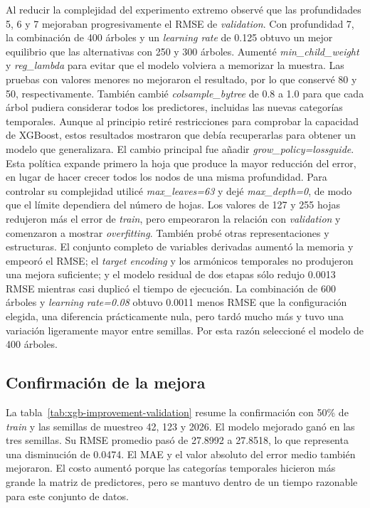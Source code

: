 \documentclass[a4paper,12pt,twocolumn]{report}
\begin{document}
Al reducir la complejidad del experimento extremo observé que las profundidades 5, 6 y 7 mejoraban progresivamente el RMSE de \textit{validation}. Con profundidad 7, la combinación de 400 árboles y un \textit{learning rate} de 0.125 obtuvo un mejor equilibrio que las alternativas con 250 y 300 árboles.
\newline
Aumenté \textit{min\_child\_weight} y \textit{reg\_lambda} para evitar que el modelo volviera a memorizar la muestra. Las pruebas con valores menores no mejoraron el resultado, por lo que conservé 80 y 50, respectivamente. También cambié \textit{colsample\_bytree} de 0.8 a 1.0 para que cada árbol pudiera considerar todos los predictores, incluidas las nuevas categorías temporales. Aunque al principio retiré restricciones para comprobar la capacidad de XGBoost, estos resultados mostraron que debía recuperarlas para obtener un modelo que generalizara.
\newline
El cambio principal fue añadir \textit{grow\_policy=lossguide}. Esta política expande primero la hoja que produce la mayor reducción del error, en lugar de hacer crecer todos los nodos de una misma profundidad. Para controlar su complejidad utilicé \textit{max\_leaves=63} y dejé \textit{max\_depth=0}, de modo que el límite dependiera del número de hojas. Los valores de 127 y 255 hojas redujeron más el error de \textit{train}, pero empeoraron la relación con \textit{validation} y comenzaron a mostrar \textit{overfitting}.
\newline
También probé otras representaciones y estructuras. El conjunto completo de variables derivadas aumentó la memoria y empeoró el RMSE; el \textit{target encoding} y los armónicos temporales no produjeron una mejora suficiente; y el modelo residual de dos etapas sólo redujo 0.0013 RMSE mientras casi duplicó el tiempo de ejecución. La combinación de 600 árboles y \textit{learning rate=0.08} obtuvo 0.0011 menos RMSE que la configuración elegida, una diferencia prácticamente nula, pero tardó mucho más y tuvo una variación ligeramente mayor entre semillas. Por esta razón seleccioné el modelo de 400 árboles.

\balance
\subsection{Confirmación de la mejora}

La tabla~\ref{tab:xgb-improvement-validation} resume la confirmación con 50\% de \textit{train} y las semillas de muestreo 42, 123 y 2026. El modelo mejorado ganó en las tres semillas. Su RMSE promedio pasó de 27.8992 a 27.8518, lo que representa una disminución de 0.0474. El MAE y el valor absoluto del error medio también mejoraron. El costo aumentó porque las categorías temporales hicieron más grande la matriz de predictores, pero se mantuvo dentro de un tiempo razonable para este conjunto de datos.
\end{document}
